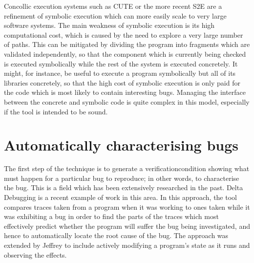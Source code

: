 Concollic execution systems such as CUTE\cite{Sen2005} or the more
recent S2E\cite{Chipounov2009} are a refinement of symbolic execution
which can more easily scale to very large software systems.  The main
weakness of symbolic execution is its high computational cost, which
is caused by the need to explore a very large number of paths.  This
can be mitigated by dividing the program into fragments which are
validated independently, so that the component which is currently
being checked is executed symbolically while the rest of the system is
executed concretely.  It might, for instance, be useful to execute a
program symbolically but all of its libraries concretely, so that the
high cost of symbolic execution is only paid for the code which is
most likely to contain interesting bugs.  Managing the interface
between the concrete and symbolic code is quite complex in this model,
especially if the tool is intended to be sound.

\nocite{Andrews2004}

\section{Automatically characterising bugs}
\label{sect:rw:auto_characterise}

The first step of the {\technique} technique is to generate a
\gls{verificationcondition} showing what must happen for a particular
bug to reproduce; in other words, to characterise the bug.  This is a
field which has been extensively researched in the past.  Delta
Debugging\cite{Cleve2005} is a recent example of work in this
area.  In this approach, the tool compares traces taken
from a program when it was working to ones taken while it was
exhibiting a bug in order to find the parts of the traces which most
effectively predict whether the program will suffer the bug being
investigated, and hence to automatically locate the root cause of the
bug.  The approach was extended by Jeffrey\cite{Jeffrey2009} to
include actively modifying a program's state as it runs and observing
the effects.

